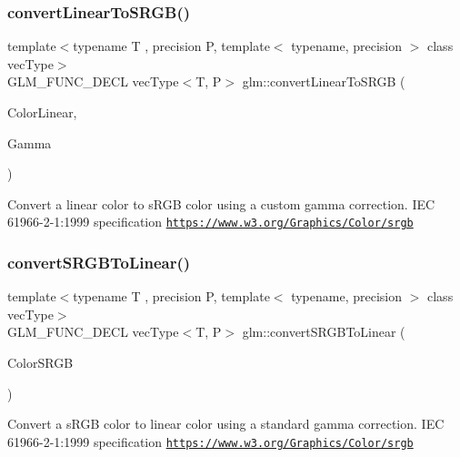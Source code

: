 \subsubsection{\texorpdfstring{convert\+Linear\+To\+S\+R\+G\+B()}{convertLinearToSRGB()}\hspace{0.1cm}{\footnotesize\ttfamily [2/2]}}
{\footnotesize\ttfamily template$<$typename T , precision P, template$<$ typename, precision $>$ class vec\+Type$>$ \\
G\+L\+M\+\_\+\+F\+U\+N\+C\+\_\+\+D\+E\+CL vec\+Type$<$T, P$>$ glm\+::convert\+Linear\+To\+S\+R\+GB (\begin{DoxyParamCaption}\item[{vec\+Type$<$ T, P $>$ const \&}]{Color\+Linear,  }\item[{T}]{Gamma }\end{DoxyParamCaption})}

Convert a linear color to s\+R\+GB color using a custom gamma correction. I\+EC 61966-\/2-\/1\+:1999 specification \href{https://www.w3.org/Graphics/Color/srgb}{\tt https\+://www.\+w3.\+org/\+Graphics/\+Color/srgb} \mbox{\label{group__gtc__color__space_ga28e98e64347cf385cadc1ceb4def55c9}} 
\subsubsection{\texorpdfstring{convert\+S\+R\+G\+B\+To\+Linear()}{convertSRGBToLinear()}}
{\footnotesize\ttfamily template$<$typename T , precision P, template$<$ typename, precision $>$ class vec\+Type$>$ \\
G\+L\+M\+\_\+\+F\+U\+N\+C\+\_\+\+D\+E\+CL vec\+Type$<$T, P$>$ glm\+::convert\+S\+R\+G\+B\+To\+Linear (\begin{DoxyParamCaption}\item[{vec\+Type$<$ T, P $>$ const \&}]{Color\+S\+R\+GB }\end{DoxyParamCaption})}

Convert a s\+R\+GB color to linear color using a standard gamma correction. I\+EC 61966-\/2-\/1\+:1999 specification \href{https://www.w3.org/Graphics/Color/srgb}{\tt https\+://www.\+w3.\+org/\+Graphics/\+Color/srgb} 